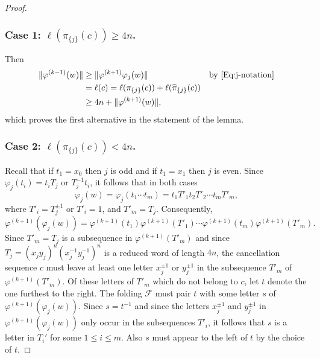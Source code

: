 \documentclass[10pt,a4paper]{amsart}
\newcommand{\C}[1]{{\mathscr #1}}
\begin{document}
\begin{proof}
\subsubsection*{Case 1: $\ell(\pi_{\{j\}}(c))\geq 4n$.}
Then
\begin{align*}
\|\varphi^{(k-1)}(w)\|
&\geq\|\varphi^{(k+1)}\varphi_{j}(w)\| &\text{by \eqref{Eq:j-notation}} \\
&= \ell(c) = \ell(\pi_{\{j\}}(c)) + \ell(\widehat{\pi}_{\{j\}}(c))\\ 
&\geq 4n + \|\varphi^{(k+1)}(w)\|,
\end{align*}
which proves the first alternative in the statement of the lemma.


\subsubsection*{Case 2: {$\ell(\pi_{\{j\}}(c))< 4n$.}}
Recall that if $t_1=x_0$ then $j$ is odd and if $t_1=x_1$ then $j$ is even.
Since $\varphi_j(t_i) = t_iT_j$ or $T_j^{-1}t_i$, it follows that in both cases
$$
\varphi_j(w) = \varphi_j(t_1\cdots t_m) = t_1T'_1t_2T'_2 \cdots t_mT'_m,
$$
where $T'_i = T_j^{\pm 1}$ or $T'_i=1$, and $T'_m=T_j$.
Consequently,
$$
\varphi^{(k+1)}(\varphi_j(w)) = \varphi^{(k+1)}(t_1)\varphi^{(k+1)}(T'_1) \cdots 
\varphi^{(k+1)}(t_m)\varphi^{(k+1)}(T'_m).
$$
Since $T'_m=T_j$ is a subsequence in $\varphi^{(k+1)}(T'_m)$ and since 
$T_j=(x_jy_j)^n(x_j^{-1}y_j^{-1})^n$
is a reduced  word of length $4n$, the cancellation sequence $c$ must leave at least
one letter $x_j^{\pm 1}$ or $y_j^{\pm 1}$ in the subsequence $T'_m$ of $\varphi^{(k+1)}(T'_m)$.
Of these letters of $T'_m$ which do not belong to $c$, let $t$ denote the one
furthest to the right. The folding $\C F$ must pair $t$ with some letter $s$
of $\varphi^{(k+1)}(\varphi_j(w))$. Since $s=t^{-1}$ and since the letters
$x_j^{\pm 1}$ and $y_j^{\pm 1}$ in $\varphi^{(k+1)}(\varphi_j(w))$ only occur
in the subsequences $T'_i$, it follows that $s$ is a letter in $T_i'$ for
some $1\leq i\leq m$. 
Also $s$ must appear to the left of $t$ by the choice of $t$.


\end{proof}
\end{document}
